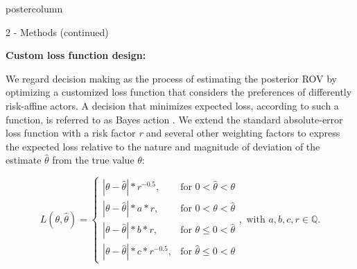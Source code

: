 \documentclass{beamer}
\begin{document}
\begin{frame}
\begin{columns}
\begin{column}{.499\textwidth}
\begin{beamercolorbox}[center]{postercolumn}
\begin{minipage}{.98\textwidth}
{\begin{myblock}{2 - Methods (continued)}

							
								\begin{minipage}[h]{0.6\textwidth} %
								\textbf{Custom loss function design:}
								
								We regard decision making as the process of estimating the posterior ROV by optimizing a customized loss function that considers the preferences of differently risk-affine actors. A decision that minimizes expected loss, according to such a function, is referred to as Bayes action \citep{davidson2015}. We extend the standard absolute-error loss function with a risk factor \textit{r} and several other weighting factors to express the expected loss relative to the nature and magnitude of deviation of the estimate $\hat{\theta}$ from the true value $\theta$:								
								
								\begin{equation*} %
																L(\theta,\hat{\theta}) =
																\begin{cases}
																|\theta - \hat{\theta}|*r^{-0.5}, & \text{for } 0<\hat{\theta}<\theta  \\
																|\theta-\hat{\theta}|*a*r, & \text{for } 0<\theta<\hat{\theta} \\
																|\theta-\hat{\theta}|*b*r, & \text{for } \theta\leq0<\hat{\theta} \\
																|\theta-\hat{\theta}|*c*r^{-0.5}, & \text{for } \hat{\theta}\leq0<\theta 
																\end{cases},
																\text{ with } a,b,c,r \in \mathbb{Q}.
								\end{equation*}
								

\end{minipage}
\end{myblock}}
\end{minipage}
\end{beamercolorbox}
\end{column}
\end{columns}
\end{frame}
\end{document}
